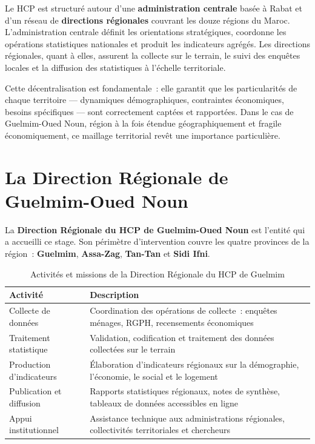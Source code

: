 \documentclass[12pt,a4paper]{report}
\begin{document}
Le HCP est structuré autour d'une \textbf{administration centrale} basée à Rabat et d'un réseau de \textbf{directions régionales} couvrant les douze régions du Maroc. L'administration centrale définit les orientations stratégiques, coordonne les opérations statistiques nationales et produit les indicateurs agrégés. Les directions régionales, quant à elles, assurent la collecte sur le terrain, le suivi des enquêtes locales et la diffusion des statistiques à l'échelle territoriale.

Cette décentralisation est fondamentale~: elle garantit que les particularités de chaque territoire --- dynamiques démographiques, contraintes économiques, besoins spécifiques --- sont correctement captées et rapportées.
Dans le cas de Guelmim-Oued Noun, région à la fois étendue géographiquement et fragile économiquement, ce maillage territorial revêt une importance particulière.

\section{La Direction Régionale de Guelmim-Oued Noun}

La \textbf{Direction Régionale du HCP de Guelmim-Oued Noun} est l'entité qui a accueilli ce stage. Son périmètre d'intervention couvre les quatre provinces de la région~: \textbf{Guelmim}, \textbf{Assa-Zag}, \textbf{Tan-Tan} et \textbf{Sidi Ifni}.

\begin{table}[H]
\centering
\caption{Activités et missions de la Direction Régionale du HCP de Guelmim}
\label{tab:hcp_services}
\begin{tabularx}{\textwidth}{L{3.8cm}X}
\toprule
\textbf{Activité} & \textbf{Description} \\
\midrule
Collecte de données & Coordination des opérations de collecte~: enquêtes ménages, RGPH, recensements économiques \\
Traitement statistique & Validation, codification et traitement des données collectées sur le terrain \\
Production d'indicateurs & Élaboration d'indicateurs régionaux sur la démographie, l'économie, le social et le logement \\
Publication et diffusion & Rapports statistiques régionaux, notes de synthèse, tableaux de données accessibles en ligne \\
Appui institutionnel & Assistance technique aux administrations régionales, collectivités territoriales et chercheurs \\
\bottomrule
\end{tabularx}
\end{table}
\end{document}
